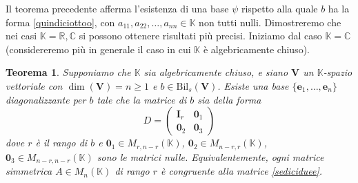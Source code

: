 \documentclass{article}
\theoremstyle{plain}
\newtheorem{thm}{Teorema}[section]
\theoremstyle{definition}
\theoremstyle{remark}
\begin{document}
\vspace{10pt}

Il teorema precedente afferma l'esistenza di una base $\psi$ rispetto alla quale $b$ ha la forma \ref{quindiciottoo}, 
con $a_{11}, a_{22}, \ldots, a_{nn} \in \mathbb{K}$ non tutti nulli. Dimostreremo che nei casi $\mathbb{K}=\mathbb{R},\mathbb{C}$ si possono ottenere risultati più precisi. 
Iniziamo dal caso $\mathbb{K} = \mathbb{C}$ (considereremo più in generale il caso in cui $\mathbb{K}$ è algebricamente chiuso).

\vspace{10pt}

\begin{bxthm}
\begin{thm}\label{sedicidue}
Supponiamo che $\mathbb{K}$ sia algebricamente chiuso, e siano $\mathbf{V}$ un $\mathbb{K}$-spazio vettoriale con
$\dim(\mathbf{V}) = n \geq 1$ e $b\in\mathrm{Bil}_s(\mathbf{V})$. 
Esiste una base $\{\mathbf{e}_1, \ldots, \mathbf{e}_n\}$ diagonalizzante per $b$ tale che la matrice 
di $b$ sia della forma
\begin{equation}\label{sediciduee}
D = \begin{pmatrix}
\mathbf{I}_r & \mathbf{0}_1 \\
\mathbf{0}_2 & \mathbf{0}_3
\end{pmatrix}    
\end{equation}
dove $r$ è il rango di $b$ e $\mathbf{0}_1\in M_{r,n-r}(\mathbb{K})$, $\mathbf{0}_2 \in M_{n-r,r}(\mathbb{K})$, 
$\mathbf{0}_3 \in M_{n-r,n-r}(\mathbb{K})$ sono le matrici nulle.
Equivalentemente, ogni matrice simmetrica $A \in M_n(\mathbb{K})$ di rango $r$ è congruente alla matrice \ref{sediciduee}.
\end{thm}    
\end{bxthm}
\end{document}
